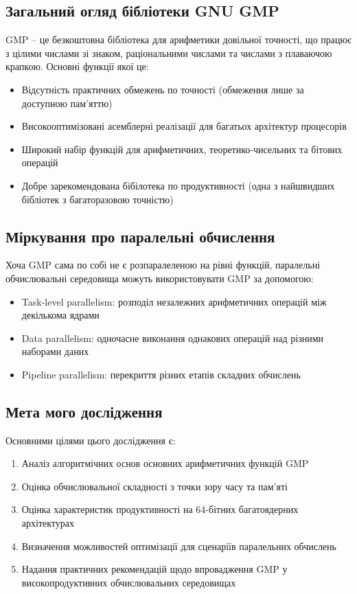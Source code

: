 \subsection{Загальний огляд бібліотеки GNU GMP}
GMP -- це безкоштовна бібліотека для арифметики довільної точності, що працює з цілими числами зі знаком, раціональними 
числами та числами з плаваючою крапкою. Основні функції якої це:
\begin{itemize}
    \item Відсутність практичних обмежень по точності (обмеження лише за доступною пам'яттю)
    \item Високооптимізовані асемблерні реалізації для багатьох архітектур процесорів
    \item Широкий набір функцій для арифметичних, теоретико-чисельних та бітових операцій
    \item Добре зарекомендована бібілотека по продуктивності (одна з найшвидших бібліотек з багаторазовою точністю)
\end{itemize}

\subsection{Міркування про паралельні обчислення}
Хоча GMP сама по собі не є розпаралеленою на рівні функцій, паралельні обчислювальні середовища можуть використовувати 
GMP за допомогою:
\begin{itemize}
    \item Task-level parallelism: розподіл незалежних арифметичних операцій між декількома ядрами
    \item Data parallelism: одночасне виконання однакових операцій над різними наборами даних
    \item Pipeline parallelism: перекриття різних етапів складних обчислень
\end{itemize}

\subsection{Мета мого дослідження}
Основними цілями цього дослідження є:
\begin{enumerate}
    \item Аналіз алгоритмічних основ основних арифметичних функцій GMP
    \item Оцінка обчислювальної складності з точки зору часу та пам'яті
    \item Оцінка характеристик продуктивності на 64-бітних багатоядерних архітектурах
    \item Визначення можливостей оптимізації для сценаріїв паралельних обчислень
    \item Надання практичних рекомендацій щодо впровадження GMP у високопродуктивних обчислювальних середовищах
\end{enumerate}

